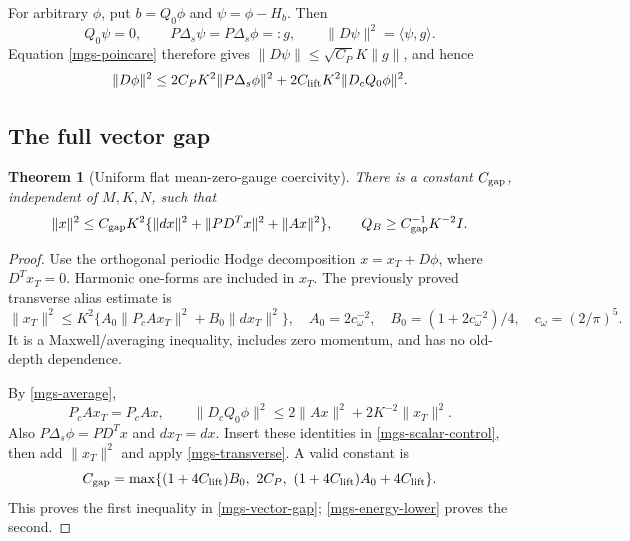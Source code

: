 \documentclass[11pt]{article}
\newtheorem{theorem}{Theorem}[section]
\theoremstyle{remark}
\begin{document}
For arbitrary \(\phi\), put \(b=Q_0\phi\) and
\(\psi=\phi-H_b\). Then
\[
 Q_0\psi=0,\qquad
 P\Delta_s\psi=P\Delta_s\phi=:g,\qquad
 \|D\psi\|^2=\langle\psi,g\rangle.
\]
Equation \eqref{mgs-poincare} therefore gives
\(\|D\psi\|\le\sqrt{C_P}K\|g\|\), and hence
\begin{equation}
 \|D\phi\|^2
 \le 2C_PK^2\|P\Delta_s\phi\|^2
           +2C_{\rm lift}K^2\|D_cQ_0\phi\|^2.
 \label{mgs-scalar-control}
\end{equation}

\subsection{The full vector gap}
\label{mgs-gap-section}

\begin{theorem}[Uniform flat mean-zero-gauge coercivity]
\label{mgs-gap-theorem}
There is a constant \(C_{\rm gap}\), independent of \(M,K,N\),
such that
\begin{equation}
 \|x\|^2\le C_{\rm gap}K^2
       \{\|dx\|^2+\|PD^Tx\|^2+\|Ax\|^2\},
 \qquad
 Q_B\ge C_{\rm gap}^{-1}K^{-2}I .
 \label{mgs-vector-gap}
\end{equation}
\end{theorem}

\begin{proof}
Use the orthogonal periodic Hodge decomposition
\(x=x_T+D\phi\), where \(D^Tx_T=0\).
Harmonic one-forms are included in \(x_T\).
The previously proved transverse alias estimate is
\begin{equation}
 \|x_T\|^2\le K^2
       \{A_0\|P_cAx_T\|^2+B_0\|dx_T\|^2\},
 \quad
 A_0=2c_\omega^{-2},\quad
 B_0=(1+2c_\omega^{-2})/4,\quad c_\omega=(2/\pi)^5.
 \label{mgs-transverse}
\end{equation}
It is a Maxwell/averaging inequality, includes zero momentum,
and has no old-depth dependence.

By \eqref{mgs-average},
\[
 P_cAx_T=P_cAx,\qquad
 \|D_cQ_0\phi\|^2
 \le2\|Ax\|^2+2K^{-2}\|x_T\|^2.
\]
Also \(P\Delta_s\phi=PD^Tx\) and \(dx_T=dx\).
Insert these identities in \eqref{mgs-scalar-control},
then add \(\|x_T\|^2\) and apply \eqref{mgs-transverse}.
A valid constant is
\begin{equation}
 C_{\rm gap}=
 \max\{(1+4C_{\rm lift})B_0,\ 2C_P,\
               (1+4C_{\rm lift})A_0+4C_{\rm lift}\}.
 \label{mgs-gap-constant}
\end{equation}
This proves the first inequality in \eqref{mgs-vector-gap};
\eqref{mgs-energy-lower} proves the second.
\end{proof}
\end{document}
